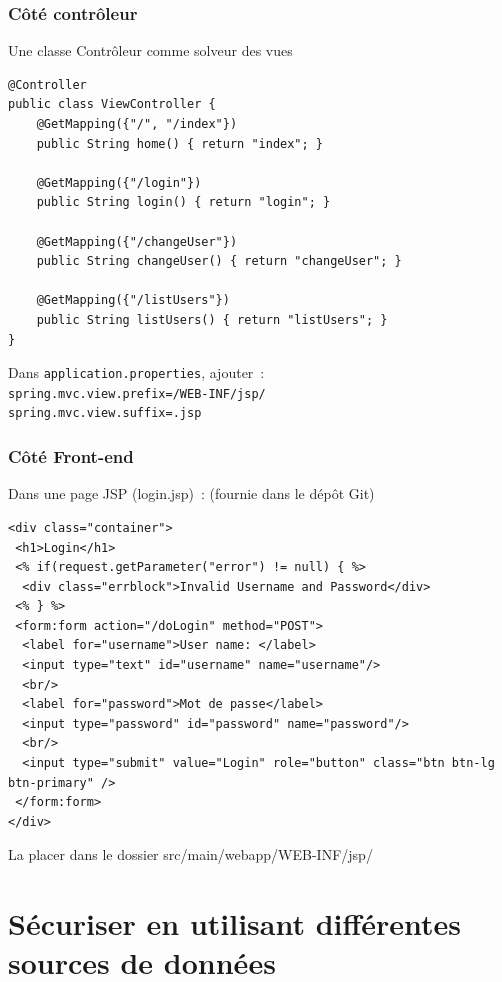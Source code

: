 \documentclass{beamer}
\begin{document}
\begin{frame}[fragile]
	\frametitle{Côté contrôleur}
	Une classe Contrôleur comme solveur des vues
\begin{lstlisting}
@Controller
public class ViewController {
	@GetMapping({"/", "/index"})
	public String home() { return "index"; }
	
	@GetMapping({"/login"})
	public String login() {	return "login"; }

	@GetMapping({"/changeUser"})
	public String changeUser() { return "changeUser"; }

	@GetMapping({"/listUsers"})
	public String listUsers() { return "listUsers"; }
}
\end{lstlisting}
Dans \texttt{application.properties}, ajouter~:\\
\footnotesize
\texttt{spring.mvc.view.prefix=/WEB-INF/jsp/\\
	spring.mvc.view.suffix=.jsp}
\normalsize
\end{frame}

\begin{frame}[fragile]
	\frametitle{Côté Front-end}
Dans une page JSP (login.jsp)~: (fournie dans le dépôt Git)
\begin{lstlisting}
<div class="container">
 <h1>Login</h1>
 <% if(request.getParameter("error") != null) { %>
  <div class="errblock">Invalid Username and Password</div>
 <% } %>
 <form:form action="/doLogin" method="POST">
  <label for="username">User name: </label>
  <input type="text" id="username" name="username"/>
  <br/>
  <label for="password">Mot de passe</label>
  <input type="password" id="password" name="password"/>
  <br/>
  <input type="submit" value="Login" role="button" class="btn btn-lg btn-primary" />
 </form:form>
</div>
\end{lstlisting}
La placer dans le dossier src/main/webapp/WEB-INF/jsp/
\end{frame}

\section{Sécuriser en utilisant différentes sources de données}
\end{document}
